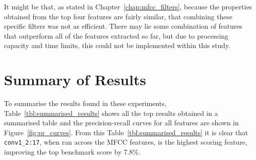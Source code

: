It might be that, as stated in Chapter~\ref{chap:mfcc_filters}, because the properties obtained from the top four features are fairly similar, that combining these specific filters was not as efficient.
There may lie some combination of features that outperform all of the features extracted so far, but due to processing capacity and time limits, this could not be implemented within this study.

\section{Summary of Results}

To summarise the results found in these experiments, Table~\ref{tbl:summarised_results} shows all the top results obtained in a summarised table and the precision-recall curves for all features are shown in Figure~\ref{fig:pr_curves}.
From this Table~\ref{tbl:summarised_results} it is clear that \texttt{conv1\_2:17}, when ran across the MFCC features, is the highest scoring feature, improving the top benchmark score by 7.8\%.

